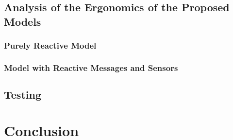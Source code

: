 \documentclass[12pt,a4paper,openright,twoside]{book}
\begin{document}
\section{Analysis of the Ergonomics of the Proposed Models}

\subsection{Purely Reactive Model}

\subsection{Model with Reactive Messages and Sensors}

\section{Testing}

\chapter{Conclusion}
\label{chap:conclusion}



\backmatter

\nocite{*} %



\end{document}
